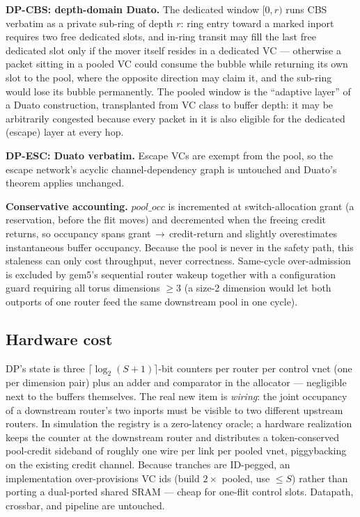\documentclass[10pt]{article}
\newcommand{\poolocc}{\mathit{pool\_occ}}
\begin{document}
\textbf{DP-CBS: depth-domain Duato.} The dedicated window $[0,r)$ runs
CBS verbatim as a private sub-ring of depth $r$: ring entry toward a
marked inport requires two free dedicated slots, and in-ring transit may
fill the last free dedicated slot only if the mover itself resides in a
dedicated VC --- otherwise a packet sitting in a pooled VC could consume
the bubble while returning its own slot to the pool, where the opposite
direction may claim it, and the sub-ring would lose its bubble
permanently. The pooled window is the ``adaptive layer'' of a Duato
construction, transplanted from VC class to buffer depth: it may be
arbitrarily congested because every packet in it is also eligible for the
dedicated (escape) layer at every hop.

\textbf{DP-ESC: Duato verbatim.} Escape VCs are exempt from the pool, so
the escape network's acyclic channel-dependency graph is untouched and
Duato's theorem applies unchanged.

\textbf{Conservative accounting.} $\poolocc$ is incremented at
switch-allocation grant (a reservation, before the flit moves) and
decremented when the freeing credit returns, so occupancy spans
grant\,$\to$\,credit-return and slightly overestimates instantaneous
buffer occupancy. Because the pool is never in the safety path, this
staleness can only cost throughput, never correctness. Same-cycle
over-admission is excluded by gem5's sequential router wakeup together
with a configuration guard requiring all torus dimensions $\ge 3$ (a
size-2 dimension would let both outports of one router feed the same
downstream pool in one cycle).

\subsection{Hardware cost}

DP's state is three $\lceil \log_2(S{+}1) \rceil$-bit counters per router
per control vnet (one per dimension pair) plus an adder and comparator in
the allocator --- negligible next to the buffers themselves. The real new
item is \emph{wiring}: the joint occupancy of a downstream router's two
inports must be visible to two different upstream routers. In simulation
the registry is a zero-latency oracle; a hardware realization keeps the
counter at the downstream router and distributes a token-conserved
pool-credit sideband of roughly one wire per link per pooled vnet,
piggybacking on the existing credit channel. Because tranches are
ID-pegged, an implementation over-provisions VC ids (build $2\times$
pooled, use $\le S$) rather than porting a dual-ported shared SRAM ---
cheap for one-flit control slots. Datapath, crossbar, and pipeline are
untouched.
\end{document}
